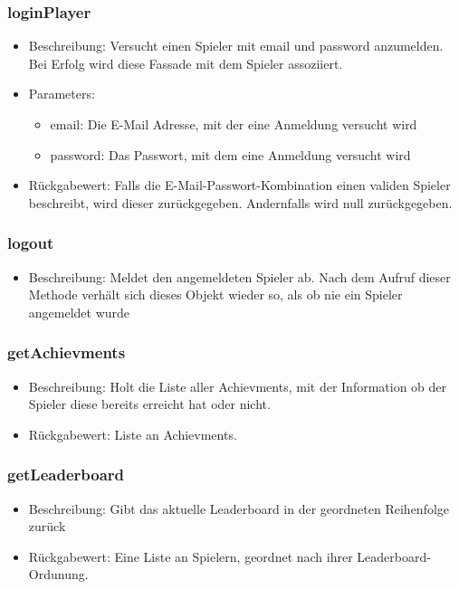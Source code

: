 \documentclass[a4paper]{scrreprt}
\begin{document}
	\subsubsection{loginPlayer}
	\begin{itemize}
		\item Beschreibung: Versucht einen Spieler mit email und password anzumelden. Bei Erfolg wird diese Fassade mit dem Spieler assoziiert.
		\item Parameters:
		\begin{itemize}
			\item email: Die E-Mail Adresse, mit der eine Anmeldung versucht wird
			\item password: Das Passwort, mit dem eine Anmeldung versucht wird
		\end{itemize}
		\item Rückgabewert: Falls die E-Mail-Passwort-Kombination einen validen Spieler beschreibt, wird dieser zurückgegeben. Andernfalls wird null zurückgegeben.
	\end{itemize}
	\subsubsection{logout}
	\begin{itemize}
		\item Beschreibung: Meldet den angemeldeten Spieler ab. Nach dem Aufruf dieser Methode verhält sich dieses Objekt wieder so, als ob nie ein Spieler angemeldet wurde
	\end{itemize}
	\subsubsection{getAchievments}
	\begin{itemize}
		\item Beschreibung: Holt die Liste aller Achievments, mit der Information ob der Spieler diese bereits erreicht hat oder nicht.
		\item Rückgabewert: Liste an Achievments.
	\end{itemize}
	\subsubsection{getLeaderboard}
	\begin{itemize}
		\item Beschreibung: Gibt das aktuelle Leaderboard in der geordneten Reihenfolge zurück
		\item Rückgabewert: Eine Liste an Spielern, geordnet nach ihrer Leaderboard-Ordunung.
	\end{itemize}
\end{document}
